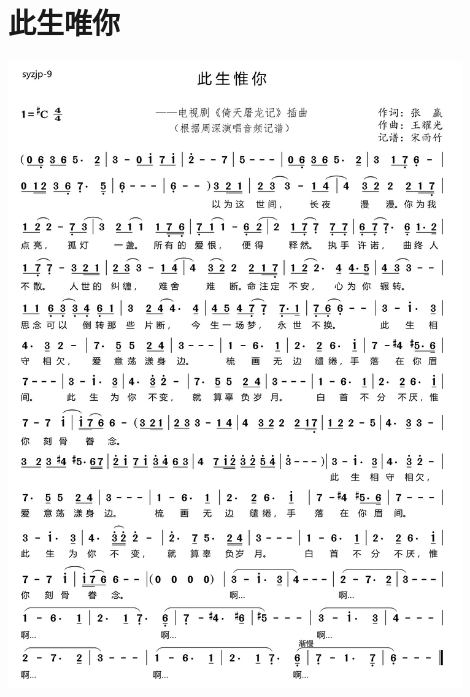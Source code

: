 \documentclass[cn,pad,twocol]{elegantbook}
\begin{document}
\section{此生唯你}              \includegraphics[width=0.9\textwidth]{rpi400/20210130此生惟你.jpg}
\end{document}
